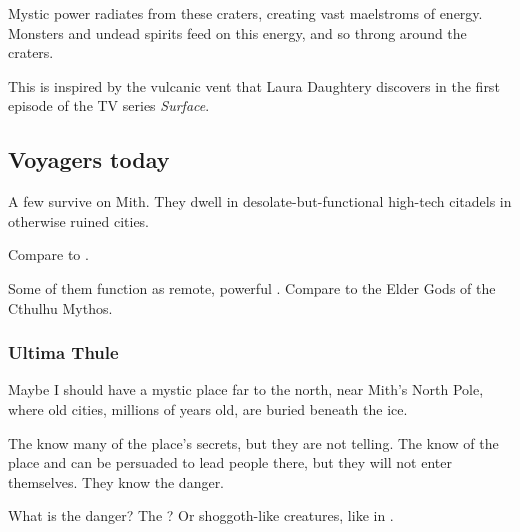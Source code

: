 Mystic power radiates from these craters, creating vast maelstroms of energy. Monsters and undead spirits feed on this energy, and so throng around the craters.

This is inspired by the vulcanic vent that Laura Daughtery discovers in the first episode of the TV series \emph{Surface}.









\subsection{Voyagers today}
\label{Voyagers today}
A few \voyagers{} survive on Mith. They dwell in desolate-but-functional high-tech citadels in otherwise ruined cities. 

Compare to .

Some of them function as remote, powerful . Compare to the Elder Gods of the Cthulhu Mythos. 





\subsubsection{Ultima Thule}
Maybe I should have a mystic place far to the north, near Mith's North Pole, where old \voyager{} cities, millions of years old, are buried beneath the ice. 

The \vlekkeshsala{} know many of the place's secrets, but they are not telling. 
The \nagae{} know of the place and can be persuaded to lead people there, but they will not enter themselves. They know the danger. 

What is the danger? The \bladedpeople? Or shoggoth-like creatures, like in .


